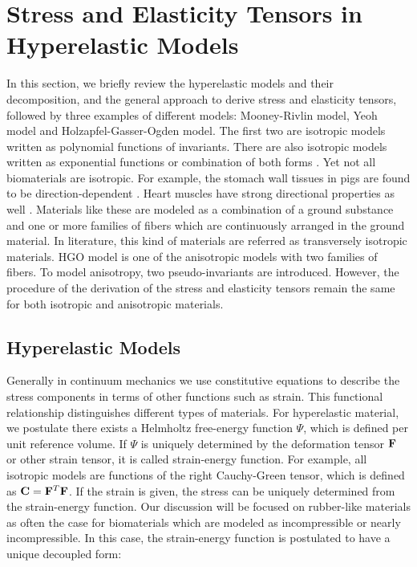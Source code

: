 \section{Stress and Elasticity Tensors in Hyperelastic Models} \label{general}
In this section, we briefly review the hyperelastic models and their decomposition, and the general approach to derive stress and elasticity tensors, followed by three examples of different models: Mooney-Rivlin model, Yeoh model and Holzapfel-Gasser-Ogden model. The first two are isotropic models written as polynomial functions of invariants. There are also isotropic models written as exponential functions or combination of both forms \cite{Fung5, Demiray, Westmann}. 
Yet not all biomaterials are isotropic. For example, the stomach wall tissues in pigs are found to be direction-dependent \cite{Zhao}. Heart muscles have strong directional properties as well \cite{Ramesh}. Materials like these are modeled as a combination of a ground substance and one or more families of fibers which are continuously arranged in the ground material. In literature, this kind of materials are referred as transversely isotropic materials. HGO model is one of the anisotropic models with two families of fibers. To model anisotropy, two pseudo-invariants are introduced. However, the procedure of the derivation of the stress and elasticity tensors remain the same for both isotropic and anisotropic materials.

%
\subsection{Hyperelastic Models}
Generally in continuum mechanics we use constitutive equations to describe the stress components in terms of other functions such as strain. This functional relationship distinguishes different types of materials. For hyperelastic material, we postulate there exists a Helmholtz free-energy function $\Psi$, which is defined per unit reference volume. If $\Psi$ is uniquely determined by the deformation tensor $\bold{F}$ or other strain tensor, it is called strain-energy function. For example, all isotropic models are functions of the right Cauchy-Green tensor, which is defined as $\bold{C} = {\bold{F}}^T{\bold{F}}$. If the strain is given, the stress can be uniquely determined from the strain-energy function. Our discussion will be focused on rubber-like materials as often the case for biomaterials which are modeled as incompressible or nearly incompressible. In this case, the strain-energy function is postulated to have a unique decoupled form:

